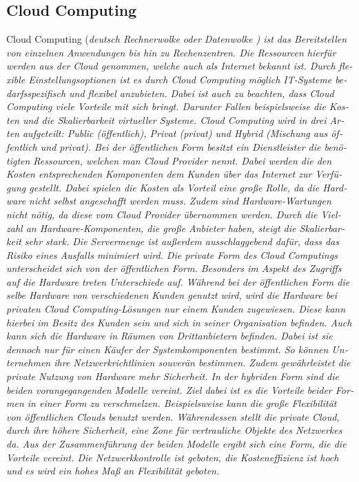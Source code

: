 
\begin{otherlanguage}{ngerman}
\subsection{Cloud Computing}
Cloud Computing (\it deutsch Rechnerwolke oder Datenwolke \rm) ist das Bereitstellen von einzelnen Anwendungen bis hin zu Rechenzentren. Die Ressourcen hierfür werden aus der \it Cloud \rm genommen, welche auch als \it Internet \rm bekannt ist. Durch flexible Einstellungsoptionen ist es durch Cloud Computing möglich IT-Systeme bedarfsspezifisch und flexibel anzubieten. Dabei ist auch zu beachten, dass Cloud Computing viele Vorteile mit sich bringt. Darunter Fallen beispielsweise die Kosten und die Skalierbarkeit virtueller Systeme. 
\newline 
Cloud Computing wird in drei Arten aufgeteilt: Public (öffentlich), Privat (privat) und Hybrid (Mischung aus öffentlich und privat). Bei der öffentlichen Form besitzt ein Dienstleister die benötigten Ressourcen, welchen man \it Cloud Provider \rm nennt. Dabei werden die den Kosten entsprechenden Komponenten dem Kunden über das Internet zur Verfügung gestellt. Dabei spielen die Kosten als Vorteil eine große Rolle, da die Hardware nicht selbst angeschafft werden muss. Zudem sind Hardware-Wartungen nicht nötig, da diese vom \it Cloud Provider \rm übernommen werden. Durch die Vielzahl an Hardware-Komponenten, die große Anbieter haben, steigt die Skalierbarkeit sehr stark. Die Servermenge ist außerdem ausschlaggebend dafür, dass das Risiko eines Ausfalls minimiert wird. 
\newline
Die private Form des Cloud Computings unterscheidet sich von der öffentlichen Form. Besonders im Aspekt des Zugriffs auf die Hardware treten Unterschiede auf. Während bei der öffentlichen Form die selbe Hardware von verschiedenen Kunden genutzt wird, wird die Hardware bei privaten Cloud Computing-Lösungen nur einem Kunden zugewiesen. Diese kann hierbei im Besitz des Kunden sein und sich in seiner Organisation befinden. Auch kann sich die Hardware in Räumen von Drittanbietern befinden. Dabei ist sie dennoch nur für einen Käufer der Systemkomponenten bestimmt. So können Unternehmen ihre Netzwerkrichtlinien souverän bestimmen. Zudem gewährleistet die private Nutzung von Hardware mehr Sicherheit. 
\newline
In der hybriden Form sind die beiden vorangegangenden Modelle vereint. Ziel dabei ist es die Vorteile beider Formen in einer Form zu verschmelzen. Beispielsweise kann die große Flexibilität von öffentlichen Clouds benutzt werden. Währendessen stellt die private Cloud, durch ihre höhere Sicherheit, eine Zone für vertrauliche Objekte des Netzwerkes da. Aus der Zusammenführung der beiden Modelle ergibt sich eine Form, die die Vorteile vereint. Die Netzwerkkontrolle ist geboten, die Kosteneffizienz ist hoch und es wird ein hohes Maß an Flexibilität geboten. 


\end{otherlanguage}
